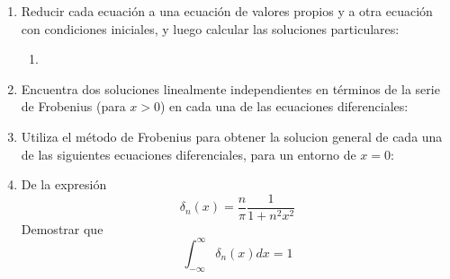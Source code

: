 \begin{enumerate}
\begin{enumerate}[label=(\alph*)]
\begin{fleqn}
\end{fleqn}
\end{enumerate}
\item Reducir cada ecuación a una ecuación de valores propios y a otra ecuación con condiciones iniciales, y luego calcular las soluciones particulares:
\begin{enumerate}[label=(\alph*)]
\item \begin{fleqn}
\[ \dfrac{\partial^{2} u}{\partial t^{2}} - \dfrac{\partial^{2} u}{\partial x^{2}} - u = 0 \hspace{1cm} \text{para } 0 < x < 1, t>0 \]
\[ \dfrac{\partial^{2} u}{\partial t} (x,0) = 0\]
\[ u(0,t) = u(1,t) = 0\]
\item \[ \dfrac{\partial^{2} u}{\partial t^{2}} + 2 \dfrac{\partial u}{\partial t} - 4 \dfrac{\partial^{2} u}{\partial x^{2}} +  u = 0 \hspace{1cm} \text{para } 0 < x < 1, t>0 \]
\[ u(x,0) = 0\]
\[ \dfrac{\partial u}{\partial x} (0,t) = u(1,t) = 0\] 
\end{fleqn}
\end{enumerate}
\item Encuentra dos soluciones linealmente independientes en términos de la serie de Frobenius (para $x > 0$) en cada una de las ecuaciones diferenciales:
\begin{enumerate}[label=(\alph*)]
\end{enumerate}
\item Utiliza el método de Frobenius para obtener la solucion general de cada una de las siguientes ecuaciones diferenciales, para un entorno de $x = 0$:
\begin{enumerate}[label=(\alph*)]
\end{enumerate}
\item De la expresión
\[ \delta_{n} (x) = \dfrac{n}{\pi} \dfrac{1}{1+n^{2}x^{2}}\]
Demostrar que
\[ \int_{-\infty}^{\infty} \delta_{n} (x) d x = 1 \]

\end{enumerate}
